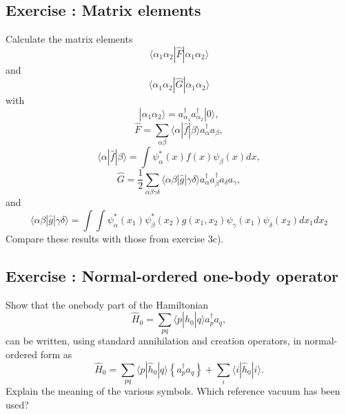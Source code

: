 \documentclass[graybox,sectrefs,envcountresetchap,open=right]{svmonodo}
\newenvironment{doconceexercise}{}{}
\newcounter{doconceexercisecounter}
\begin{document}
\begin{doconceexercise}

\subsection*{Exercise \thedoconceexercisecounter: Matrix elements}


Calculate the matrix elements
\[
\langle \alpha_{1}\alpha_{2}|\hat{F}|\alpha_{1}\alpha_{2}\rangle
\]
and
\[
\langle \alpha_{1}\alpha_{2}|\hat{G}|\alpha_{1}\alpha_{2}\rangle
\]
with
\[
|\alpha_{1}\alpha_{2}\rangle=a_{\alpha_{1}}^{\dagger}a_{\alpha_{2}}^{\dagger}|0\rangle ,
\]
\[
\hat{F}=\sum_{\alpha\beta}\langle \alpha|\hat{f}|\beta\rangle
a_{\alpha}^{\dagger}a_{\beta}  ,
\]
\[
\langle \alpha|\hat{f}|\beta\rangle=\int \psi_{\alpha}^{*}(x)f(x)\psi_{\beta}(x)dx ,
\]
\[
\hat{G} = \frac{1}{2}\sum_{\alpha\beta\gamma\delta}
\langle \alpha\beta |\hat{g}|\gamma\delta\rangle
a_{\alpha}^{\dagger}a_{\beta}^{\dagger}a_{\delta}a_{\gamma} ,
\]
and
\[
\langle \alpha\beta |\hat{g}|\gamma\delta\rangle=
\int\int \psi_{\alpha}^{*}(x_{1})\psi_{\beta}^{*}(x_{2})g(x_{1},
x_{2})\psi_{\gamma}(x_{1})\psi_{\delta}(x_{2})dx_{1}dx_{2}
\]
Compare these results with those from exercise 3c).

\end{doconceexercise}




\begin{doconceexercise}

\subsection*{Exercise \thedoconceexercisecounter: Normal-ordered one-body operator}


Show that the onebody part of the Hamiltonian
\[	     
\hat{H}_0 = \sum_{pq} \langle p|\hat{h}_0|q\rangle a^{\dagger}_p a_q,
\]
can be written, using standard annihilation and creation operators, in normal-ordered form as 
\[
\hat{H}_0 = \sum_{pq} \langle p|\hat{h}_0|q\rangle \left\{a^\dagger_p a_q\right\} +
             \sum_i \langle i|\hat{h}_0|i\rangle.
\]
Explain the meaning of the various symbols. Which reference 
vacuum has been used?

\end{doconceexercise}
\end{document}

